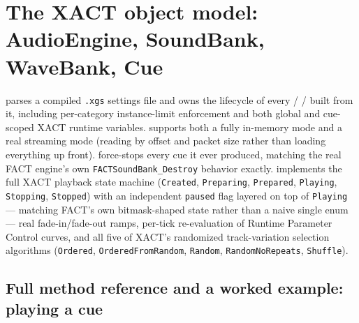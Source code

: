\section{The XACT object model: AudioEngine, SoundBank, WaveBank, Cue}

 parses a compiled \texttt{.xgs} settings file and owns the lifecycle of
every  /  /  built from it, including
per-category instance-limit enforcement and both global and cue-scoped XACT runtime
variables.  supports both a fully in-memory mode and a real streaming mode
(reading by offset and packet size rather than loading everything up front).
 force-stops every cue it ever produced, matching the real
FACT engine's own \texttt{FACTSoundBank\_Destroy} behavior exactly.  implements
the full XACT playback state machine (\texttt{Created}, \texttt{Preparing}, \texttt{Prepared},
\texttt{Playing}, \texttt{Stopping}, \texttt{Stopped}) with an independent \texttt{paused}
flag layered on top of \texttt{Playing} --- matching FACT's own bitmask-shaped state rather
than a naive single enum --- real fade-in/fade-out ramps, per-tick re-evaluation of
Runtime Parameter Control curves, and all five of XACT's randomized track-variation selection
algorithms (\texttt{Ordered}, \texttt{OrderedFromRandom}, \texttt{Random},
\texttt{RandomNoRepeats}, \texttt{Shuffle}).

\subsection{Full method reference and a worked example: playing a cue}

